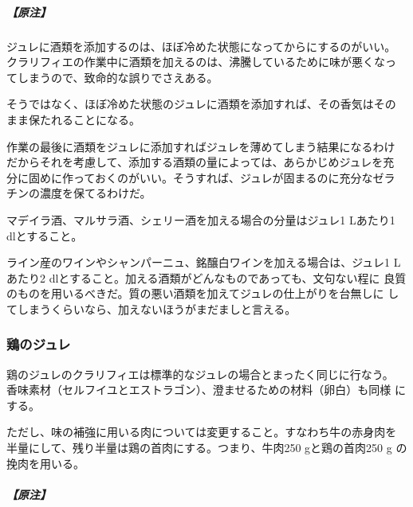 \begin{recette}
\hypertarget{nota-gelees-grasses-ordinaires}{%
\subparagraph{【原注】}\label{nota-gelees-grasses-ordinaires}}

ジュレに酒類を添加するのは、ほぼ冷めた状態になってからにするのがいい。
クラリフィエの作業中に酒類を加えるのは、沸騰しているために味が悪くなっ
てしまうので、致命的な誤りでさえある。

そうではなく、ほぼ冷めた状態のジュレに酒類を添加すれば、その香気はその
まま保たれることになる。

作業の最後に酒類をジュレに添加すればジュレを薄めてしまう結果になるわけ
だからそれを考慮して、添加する酒類の量によっては、あらかじめジュレを充
分に固めに作っておくのがいい。そうすれば、ジュレが固まるのに充分なゼラ
チンの濃度を保てるわけだ。

マデイラ酒、マルサラ酒、シェリー酒を加える場合の分量はジュレ1 Lあたり1
dlとすること。

ライン産のワインやシャンパーニュ、銘醸白ワインを加える場合は、ジュレ1
Lあたり2 dlとすること。加える酒類がどんなものであっても、文句ない程に
良質のものを用いるべきだ。質の悪い酒類を加えてジュレの仕上がりを台無しに
してしまうくらいなら、加えないほうがまだましと言える。

\maeaki

\hypertarget{gelees-de-volaille}{%
\subsubsection{鶏のジュレ}\label{gelees-de-volaille}}



鶏のジュレのクラリフィエは標準的なジュレの場合とまったく同じに行なう。
香味素材（セルフイユとエストラゴン）、澄ませるための材料（卵白）も同様
にする。

ただし、味の補強に用いる肉については変更すること。すなわち牛の赤身肉を
半量にして、残り半量は鶏の首肉にする。つまり、牛肉250 gと鶏の首肉250 g
の挽肉を用いる。

\hypertarget{nota-gelee-de-volaile}{%
\subparagraph{【原注】}\label{nota-gelee-de-volaile}}


\end{recette}
